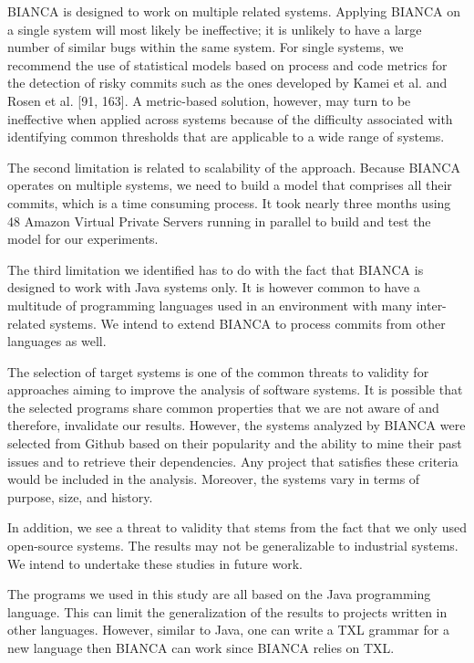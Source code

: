 \documentclass[12pt]{report}
\begin{document}
BIANCA is designed to work on multiple related systems. Applying BIANCA
on a single system will most likely be ineffective; it is unlikely to
have a large number of similar bugs within the same system. For single
systems, we recommend the use of statistical models based on process and
code metrics for the detection of risky commits such as the ones
developed by Kamei et al. and Rosen et al. {[}91, 163{]}. A metric-based
solution, however, may turn to be ineffective when applied across
systems because of the difficulty associated with identifying common
thresholds that are applicable to a wide range of systems.

The second limitation is related to scalability of the approach. Because
BIANCA operates on multiple systems, we need to build a model that
comprises all their commits, which is a time consuming process. It took
nearly three months using 48 Amazon Virtual Private Servers running in
parallel to build and test the model for our experiments.

The third limitation we identified has to do with the fact that BIANCA
is designed to work with Java systems only. It is however common to have
a multitude of programming languages used in an environment with many
inter-related systems. We intend to extend BIANCA to process commits
from other languages as well.

The selection of target systems is one of the common threats to validity
for approaches aiming to improve the analysis of software systems. It is
possible that the selected programs share common properties that we are
not aware of and therefore, invalidate our results. However, the systems
analyzed by BIANCA were selected from Github based on their popularity
and the ability to mine their past issues and to retrieve their
dependencies. Any project that satisfies these criteria would be
included in the analysis. Moreover, the systems vary in terms of
purpose, size, and history.

In addition, we see a threat to validity that stems from the fact that
we only used open-source systems. The results may not be generalizable
to industrial systems. We intend to undertake these studies in future
work.

The programs we used in this study are all based on the Java programming
language. This can limit the generalization of the results to projects
written in other languages. However, similar to Java, one can write a
TXL grammar for a new language then BIANCA can work since BIANCA relies
on TXL.
\end{document}
